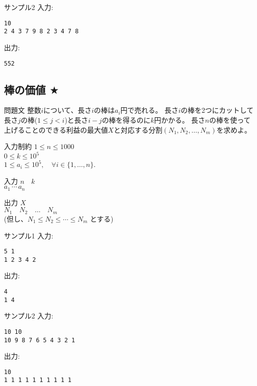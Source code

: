 \documentclass[a4paper,twoside,onecolumn,openany,article,10pt]{memoir}
\theoremstyle{remark}
\begin{document}
\begin{itembox}[l]{サンプル2}
入力:
\begin{verbatim}
10
2 4 3 7 9 8 2 3 4 7 8
\end{verbatim}
出力:
\begin{verbatim}
552
\end{verbatim}
\end{itembox}


\clearpage
\subsection{棒の価値 $\bigstar$}
\begin{itembox}[l]{問題文}
整数$i$について、長さ$i$の棒は$a_i$円で売れる。
長さ$i$の棒を2つにカットして長さ$j$の棒($1\le j< i$)と長さ$i-j$の棒を得るのに$k$円かかる。
長さ$n$の棒を使って上げることのできる利益の最大値$X$と対応する分割$(N_1, N_2, \dotsc, N_m)$を求めよ。
\end{itembox}

\begin{itembox}[l]{入力制約}
$1\le n\le 1000$\\
$0\le k\le 10^5$\\
$1\le a_i\le 10^5,\quad\forall i\in\{1,\dotsc,n\}$.
\end{itembox}

\begin{itembox}[l]{入力}
$n\quad k$\\
$a_1\, \cdots\, a_n$
\end{itembox}

\begin{itembox}[l]{出力}
$X$\\
$N_1\quad N_2\quad \dotsc\quad N_m$\\
(但し、$N_1\le N_2\le\dotsb \le N_m$ とする)
\end{itembox}

\begin{itembox}[l]{サンプル1}
入力:
\begin{verbatim}
5 1
1 2 3 4 2
\end{verbatim}
出力:
\begin{verbatim}
4
1 4
\end{verbatim}
\end{itembox}

\begin{itembox}[l]{サンプル2}
入力:
\begin{verbatim}
10 10
10 9 8 7 6 5 4 3 2 1
\end{verbatim}
出力:
\begin{verbatim}
10
1 1 1 1 1 1 1 1 1 1
\end{verbatim}
\end{itembox}
\end{document}
